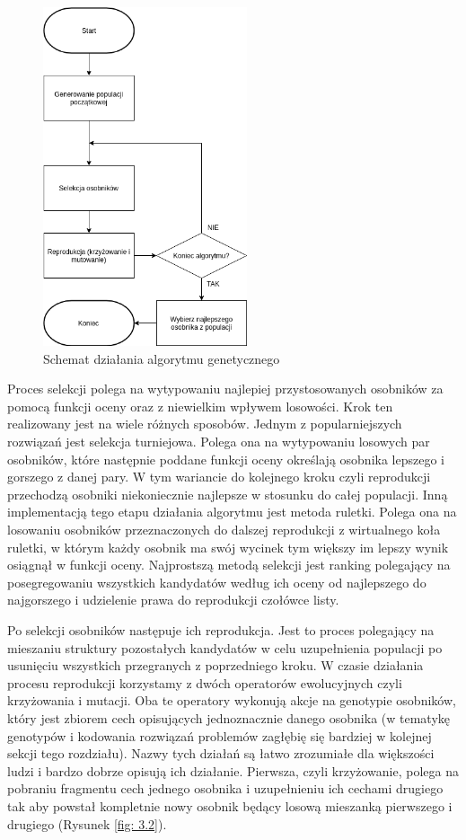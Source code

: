 \documentclass[12pt, oneside, a4paper]{report}
\begin{document}
\begin{figure}[h]
	\centering
	\includegraphics[width=6cm]{fig31.png}
	\caption{Schemat działania algorytmu genetycznego}
	\label{fig: 3.1}
\end{figure}

Proces selekcji polega na wytypowaniu najlepiej przystosowanych osobników za pomocą funkcji oceny oraz z niewielkim wpływem losowości. Krok ten realizowany jest na wiele różnych sposobów. Jednym z popularniejszych rozwiązań jest selekcja turniejowa. Polega ona na wytypowaniu losowych par osobników, które następnie poddane funkcji oceny określają osobnika lepszego i gorszego z danej pary. W tym wariancie do kolejnego kroku czyli reprodukcji przechodzą osobniki niekoniecznie najlepsze w stosunku do całej populacji. Inną implementacją tego etapu działania algorytmu jest metoda ruletki. Polega ona na losowaniu osobników przeznaczonych do dalszej reprodukcji z wirtualnego koła ruletki, w którym każdy osobnik ma swój wycinek tym większy im lepszy wynik osiągnął w funkcji oceny. Najprostszą metodą selekcji jest ranking polegający na posegregowaniu wszystkich kandydatów według ich oceny od najlepszego do najgorszego i udzielenie prawa do reprodukcji czołówce listy.

Po selekcji osobników następuje ich reprodukcja. Jest to proces polegający na mieszaniu struktury pozostałych kandydatów w celu uzupełnienia populacji po usunięciu wszystkich przegranych z poprzedniego kroku. W czasie działania procesu reprodukcji korzystamy z dwóch operatorów ewolucyjnych czyli krzyżowania i mutacji. Oba te operatory wykonują akcje na genotypie osobników, który jest zbiorem cech opisujących jednoznacznie danego osobnika (w tematykę genotypów i kodowania rozwiązań problemów zagłębię się bardziej w kolejnej sekcji tego rozdziału). Nazwy tych działań są łatwo zrozumiałe dla większości ludzi i bardzo dobrze opisują ich działanie. Pierwsza, czyli krzyżowanie, polega na pobraniu fragmentu cech jednego osobnika i uzupełnieniu ich cechami drugiego tak aby powstał kompletnie nowy osobnik będący losową mieszanką pierwszego i drugiego (Rysunek \ref{fig: 3.2}). 
\end{document}
